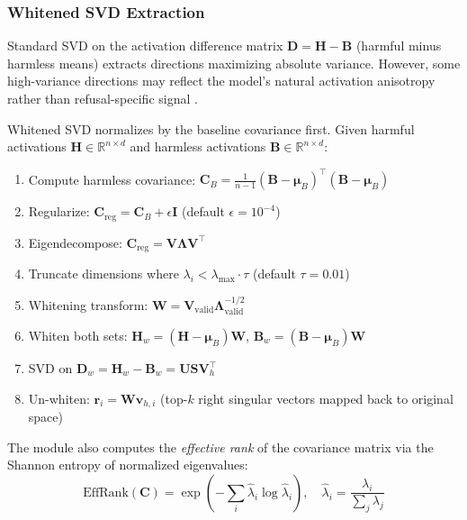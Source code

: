 \documentclass[11pt]{article}
\begin{document}
\subsubsection{Whitened SVD Extraction}
\label{sec:whitened_svd}

Standard SVD on the activation difference matrix $\mathbf{D} = \mathbf{H} - \mathbf{B}$ (harmful minus harmless means) extracts directions maximizing absolute variance. However, some high-variance directions may reflect the model's natural activation anisotropy rather than refusal-specific signal \citep{ethayarajh2019contextual}.

Whitened SVD normalizes by the baseline covariance first. Given harmful activations $\mathbf{H} \in \mathbb{R}^{n \times d}$ and harmless activations $\mathbf{B} \in \mathbb{R}^{n \times d}$:

\begin{enumerate}
    \item Compute harmless covariance: $\mathbf{C}_B = \frac{1}{n-1}(\mathbf{B} - \boldsymbol{\mu}_B)^\top(\mathbf{B} - \boldsymbol{\mu}_B)$
    \item Regularize: $\mathbf{C}_{\text{reg}} = \mathbf{C}_B + \epsilon \mathbf{I}$ \quad (default $\epsilon = 10^{-4}$)
    \item Eigendecompose: $\mathbf{C}_{\text{reg}} = \mathbf{V} \boldsymbol{\Lambda} \mathbf{V}^\top$
    \item Truncate dimensions where $\lambda_i < \lambda_{\max} \cdot \tau$ \quad (default $\tau = 0.01$)
    \item Whitening transform: $\mathbf{W} = \mathbf{V}_{\text{valid}} \boldsymbol{\Lambda}_{\text{valid}}^{-1/2}$
    \item Whiten both sets: $\mathbf{H}_w = (\mathbf{H} - \boldsymbol{\mu}_B)\mathbf{W}$, \quad $\mathbf{B}_w = (\mathbf{B} - \boldsymbol{\mu}_B)\mathbf{W}$
    \item SVD on $\mathbf{D}_w = \mathbf{H}_w - \mathbf{B}_w = \mathbf{U}\mathbf{S}\mathbf{V}_h^\top$
    \item Un-whiten: $\mathbf{r}_i = \mathbf{W} \mathbf{v}_{h,i}$ (top-$k$ right singular vectors mapped back to original space)
\end{enumerate}

The module also computes the \emph{effective rank} of the covariance matrix via the Shannon entropy of normalized eigenvalues:
\begin{equation}
    \text{EffRank}(\mathbf{C}) = \exp\left(-\sum_i \hat{\lambda}_i \log \hat{\lambda}_i\right), \quad \hat{\lambda}_i = \frac{\lambda_i}{\sum_j \lambda_j}
    \label{eq:effrank}
\end{equation}
\end{document}

